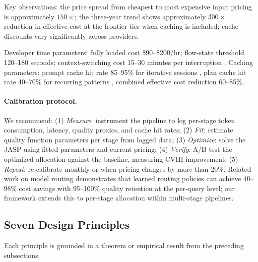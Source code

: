 Key observations: the price spread from cheapest to most expensive input pricing is approximately $150\times$; the three-year trend shows approximately $300\times$ reduction in effective cost at the frontier tier when caching is included; cache discounts vary significantly across providers.

Developer time parameters: fully loaded cost \$90--\$200/hr; flow-state threshold 120--180 seconds; context-switching cost 15--30 minutes per interruption \citep{mark2008interrupted}. Caching parameters: prompt cache hit rate 85--95\% for iterative sessions \citep{anthropic2026coding}, plan cache hit rate 40--70\% for recurring patterns \citep{zhang2025plancache}, combined effective cost reduction 60--85\%.

\paragraph{Calibration protocol.} We recommend: (1) \emph{Measure}: instrument the pipeline to log per-stage token consumption, latency, quality proxies, and cache hit rates; (2) \emph{Fit}: estimate quality function parameters per stage from logged data; (3) \emph{Optimize}: solve the JASP using fitted parameters and current pricing; (4) \emph{Verify}: A/B test the optimized allocation against the baseline, measuring CVIH improvement; (5) \emph{Repeat}: re-calibrate monthly or when pricing changes by more than 20\%. Related work on model routing \citep{chen2023frugalgpt, madaan2024automix, ong2024routellm} demonstrates that learned routing policies can achieve 40--98\% cost savings with 95--100\% quality retention at the per-query level; our framework extends this to per-stage allocation within multi-stage pipelines.

\subsection{Seven Design Principles}

Each principle is grounded in a theorem or empirical result from the preceding subsections.

